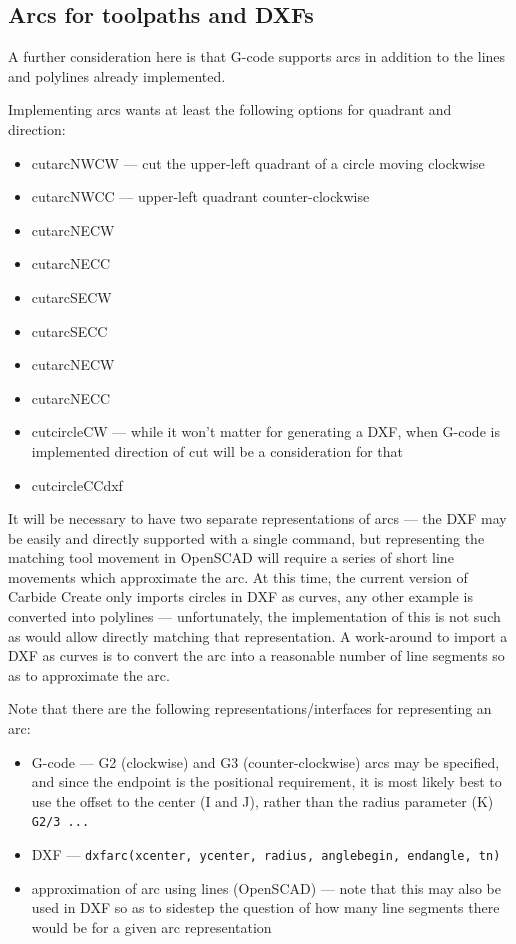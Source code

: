 \documentclass{ltxdoc}
\begin{document}
\subsection{Arcs for toolpaths and DXFs}
 
A further consideration here is that G-code supports arcs in addition to the lines and
polylines already implemented. 

Implementing arcs wants at least the following options for quadrant and direction:
 
\begin{itemize}
\item cutarcNWCW --- cut the upper-left quadrant of a circle moving clockwise
\item cutarcNWCC --- upper-left quadrant counter-clockwise
\item cutarcNECW
\item cutarcNECC
\item cutarcSECW
\item cutarcSECC
\item cutarcNECW
\item cutarcNECC
\item cutcircleCW --- while it won’t matter for generating a DXF, when G-code is implemented
                      direction of cut will be a consideration for that
\item cutcircleCCdxf
\end{itemize}
 
It will be necessary to have two separate representations of arcs --- the DXF may be easily and directly supported with a single command, but representing the matching tool movement in OpenSCAD will require a series of short line movements which approximate the arc. At this time, the current version of Carbide Create only imports circles in DXF as curves, any other example is converted into polylines --- unfortunately, the implementation of this is not such as would allow directly matching that representation. A work-around to import a DXF as curves is to convert the arc into a reasonable number of line segments so as to approximate the arc.
 
\begin{samepage}
Note that there are the following representations/interfaces for representing an arc:
 
\begin{itemize}
\item G-code --- G2 (clockwise) and G3 (counter-clockwise) arcs may be specified, and since 
      the endpoint is the positional requirement, it is most likely best to use the offset 
      to the center (I and J), rather than the radius parameter (K) \texttt{G2/3 ...} 
\item DXF --- \texttt{dxfarc(xcenter, ycenter, radius, anglebegin, endangle, tn)}
\item approximation of arc using lines (OpenSCAD) --- note that this may also be used 
      in DXF so as to sidestep the question of how many line segments there would be
      for a given arc representation 
\end{itemize}
\end{samepage}
 
\end{document}

